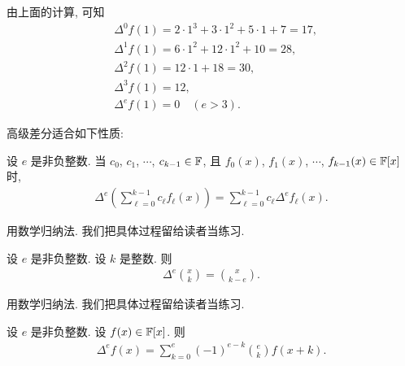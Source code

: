 \begin{example}
    由上面的计算, 可知
    \begin{align*}
         & \Delta^0 f(1) = 2 \cdot 1^3 + 3 \cdot 1^2 + 5 \cdot 1 + 7 = 17, \\
         & \Delta^1 f(1) = 6 \cdot 1^2 + 12 \cdot 1^2 + 10 = 28,           \\
         & \Delta^2 f(1) = 12 \cdot 1 + 18 = 30,                           \\
         & \Delta^3 f(1) = 12,                                             \\
         & \Delta^e f(1) = 0 \quad (e > 3).
    \end{align*}
\end{example}

高级差分适合如下性质:

\begin{proposition}
    设 $e$ 是非负整数. 当 $c_0$, $c_1$, $\cdots$, $c_{k-1} \in \mathbb{F}$, 且 $f_0 (x)$, $f_1 (x)$, $\cdots$, $f_{k-1} (x) \in \mathbb{F}[x]$ 时,
    \begin{align*}
        \Delta^e \left( \sum_{\ell = 0}^{k-1} c_\ell f_\ell (x) \right)
        = \sum_{\ell = 0}^{k-1} c_\ell \Delta^e f_\ell (x).
    \end{align*}
\end{proposition}

\begin{pf}
    用数学归纳法. 我们把具体过程留给读者当练习.
\end{pf}

\begin{proposition}
    设 $e$ 是非负整数. 设 $k$ 是整数. 则
    \begin{align*}
        \Delta^e \binom{x}{k} = \binom{x}{k - e}.
    \end{align*}
\end{proposition}

\begin{pf}
    用数学归纳法. 我们把具体过程留给读者当练习.
\end{pf}

\begin{proposition}
    设 $e$ 是非负整数. 设 $f(x) \in \mathbb{F}[x]$. 则
    \begin{align*}
        \Delta^e f(x) = \sum_{k = 0}^{e} (-1)^{e-k} \binom{e}{k} f(x+k).
    \end{align*}
\end{proposition}


